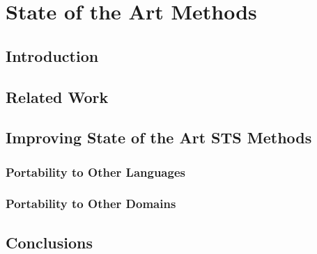 \chapter{\label{cha:sts_state_of_the_art_methods}State of the Art Methods}

\section{Introduction}
\cite{ranasinghe-etal-2019-enhancing}
\section{Related Work}
\section{Improving State of the Art STS Methods}
\subsection{Portability to Other Languages}
\subsection{Portability to Other Domains}
\section{Conclusions}